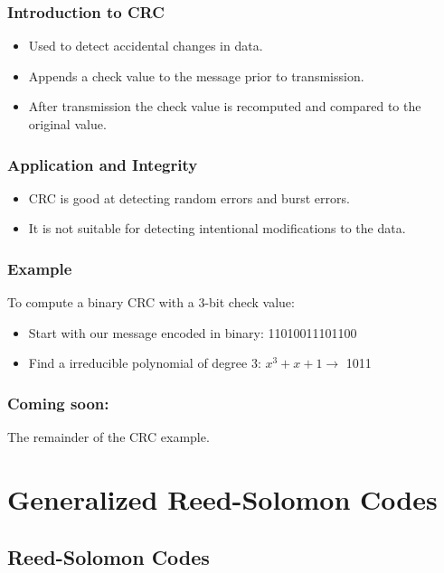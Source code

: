 \documentclass{beamer}
\begin{document}
\begin{frame}
	\frametitle{Introduction to CRC}
	\begin{itemize}
		\item Used to detect accidental changes in data.
		\item Appends a check value to the message prior to transmission.
		\item After transmission the check value is recomputed and compared to the original value.
	\end{itemize}
\end{frame}

\begin{frame}
	\frametitle{Application and Integrity}
	\begin{itemize}
		\item CRC is good at detecting random errors and burst errors.
		\item It is not suitable for detecting intentional modifications to the data.
	\end{itemize}
\end{frame}

\begin{frame}
	\frametitle{Example}
	To compute a binary CRC with a 3-bit check value:
	\begin{itemize}
		\item Start with our message encoded in binary: 11010011101100
		\item Find a irreducible polynomial of degree 3: $x^{3} + x + 1 \rightarrow$ 1011
	\end{itemize}
\end{frame}

\begin{frame}
	\frametitle{Coming soon:}
	The remainder of the CRC example.
\end{frame}



\section{Generalized Reed-Solomon Codes}

\subsection{Reed-Solomon Codes}
\end{document}
